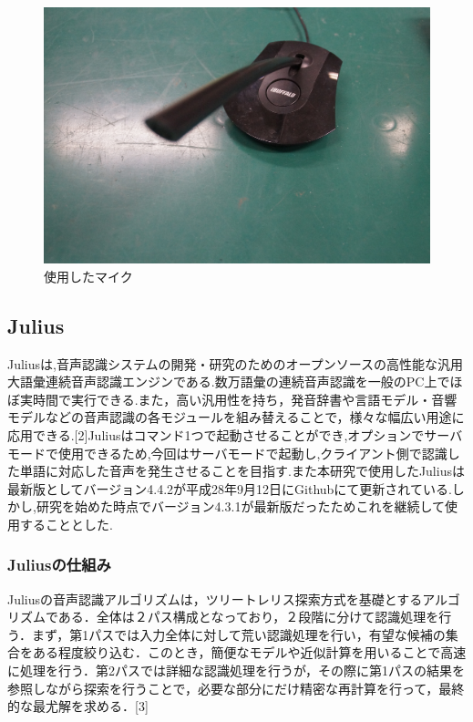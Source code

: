 \documentclass[12pt,oneside]{sotsuken_paper}
\begin{document}
\begin{figure}[htbp]
\begin{center}
\includegraphics[width=120mm]{img/mic.JPG}
\caption{使用したマイク}
\label{fig:mic}
\end{center}
\end{figure}


\subsection{Julius}
Juliusは,音声認識システムの開発・研究のためのオープンソースの高性能な汎用大語彙連続音声認識エンジンである.数万語彙の連続音声認識を一般のPC上でほぼ実時間で実行できる.また，高い汎用性を持ち，発音辞書や言語モデル・音響モデルなどの音声認識の各モジュールを組み替えることで，様々な幅広い用途に応用できる.[2]Juliusはコマンド1つで起動させることができ,オプションでサーバモードで使用できるため,今回はサーバモードで起動し,クライアント側で認識した単語に対応した音声を発生させることを目指す.また本研究で使用したJuliusは最新版としてバージョン4.4.2が平成28年9月12日にGithubにて更新されている.しかし,研究を始めた時点でバージョン4.3.1が最新版だったためこれを継続して使用することとした.

\subsubsection{Juliusの仕組み}
Juliusの音声認識アルゴリズムは，ツリートレリス探索方式を基礎とするアルゴリズムである．全体は２パス構成となっており，２段階に分けて認識処理を行う．まず，第1パスでは入力全体に対して荒い認識処理を行い，有望な候補の集合をある程度絞り込む．このとき，簡便なモデルや近似計算を用いることで高速に処理を行う．第2パスでは詳細な認識処理を行うが，その際に第1パスの結果を参照しながら探索を行うことで，必要な部分にだけ精密な再計算を行って，最終的な最尤解を求める．[3]
\end{document}
